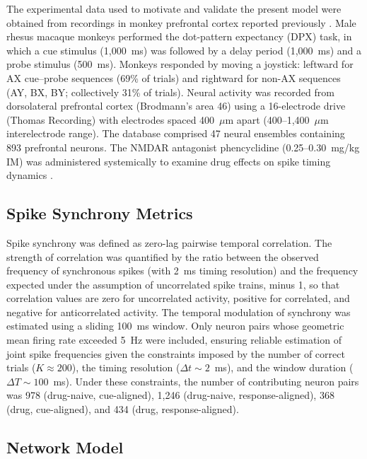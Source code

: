 \documentclass[10pt]{article}
\begin{document}
The experimental data used to motivate and validate the present model were obtained from recordings in monkey prefrontal cortex reported previously \citep{zick2018blocking}. Male rhesus macaque monkeys performed the dot-pattern expectancy (DPX) task, in which a cue stimulus (1,000~ms) was followed by a delay period (1,000~ms) and a probe stimulus (500~ms). Monkeys responded by moving a joystick: leftward for AX cue--probe sequences (69\% of trials) and rightward for non-AX sequences (AY, BX, BY; collectively 31\% of trials). Neural activity was recorded from dorsolateral prefrontal cortex (Brodmann's area 46) using a 16-electrode drive (Thomas Recording) with electrodes spaced 400~$\mu$m apart (400--1,400~$\mu$m interelectrode range). The database comprised 47 neural ensembles containing 893 prefrontal neurons. The NMDAR antagonist phencyclidine (0.25--0.30~mg/kg IM) was administered systemically to examine drug effects on spike timing dynamics \citep{zick2018blocking}.

\subsection{Spike Synchrony Metrics}

Spike synchrony was defined as zero-lag pairwise temporal correlation. The strength of correlation was quantified by the ratio between the observed frequency of synchronous spikes (with 2~ms timing resolution) and the frequency expected under the assumption of uncorrelated spike trains, minus 1, so that correlation values are zero for uncorrelated activity, positive for correlated, and negative for anticorrelated activity. The temporal modulation of synchrony was estimated using a sliding 100~ms window. Only neuron pairs whose geometric mean firing rate exceeded 5~Hz were included, ensuring reliable estimation of joint spike frequencies given the constraints imposed by the number of correct trials ($K \approx 200$), the timing resolution ($\Delta t \sim 2$~ms), and the window duration ($\Delta T \sim 100$~ms). Under these constraints, the number of contributing neuron pairs was 978 (drug-naive, cue-aligned), 1,246 (drug-naive, response-aligned), 368 (drug, cue-aligned), and 434 (drug, response-aligned).

\subsection{Network Model}
\end{document}
